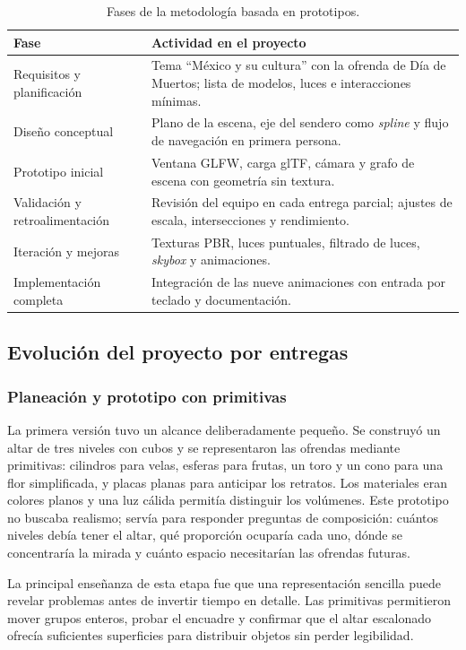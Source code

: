 \documentclass[letter,12pt]{article}
\begin{document}
	\begin{table}[H]
		\centering
		\small
		\begin{tabularx}{\textwidth}{p{4.2cm}X}
			\toprule
			\textbf{Fase} & \textbf{Actividad en el proyecto}\\
			\midrule
			Requisitos y planificación & Tema ``México y su cultura'' con la ofrenda de Día de Muertos; lista de modelos, luces e interacciones mínimas. \\
			Diseño conceptual & Plano de la escena, eje del sendero como \textit{spline} y flujo de navegación en primera persona. \\
			Prototipo inicial & Ventana GLFW, carga glTF, cámara y grafo de escena con geometría sin textura. \\
			Validación y retroalimentación & Revisión del equipo en cada entrega parcial; ajustes de escala, intersecciones y rendimiento. \\
			Iteración y mejoras & Texturas PBR, luces puntuales, filtrado de luces, \textit{skybox} y animaciones. \\
			Implementación completa & Integración de las nueve animaciones con entrada por teclado y documentación. \\
			\bottomrule
		\end{tabularx}
		\caption{Fases de la metodología basada en prototipos.}
		\label{tab:fases}
	\end{table}

	\subsection{Evolución del proyecto por entregas}
	\subsubsection{Planeación y prototipo con primitivas}
	La primera versión tuvo un alcance deliberadamente pequeño. Se construyó un altar de tres niveles con cubos y se representaron las ofrendas mediante primitivas: cilindros para velas, esferas para frutas, un toro y un cono para una flor simplificada, y placas planas para anticipar los retratos. Los materiales eran colores planos y una luz cálida permitía distinguir los volúmenes. Este prototipo no buscaba realismo; servía para responder preguntas de composición: cuántos niveles debía tener el altar, qué proporción ocuparía cada uno, dónde se concentraría la mirada y cuánto espacio necesitarían las ofrendas futuras.

	La principal enseñanza de esta etapa fue que una representación sencilla puede revelar problemas antes de invertir tiempo en detalle. Las primitivas permitieron mover grupos enteros, probar el encuadre y confirmar que el altar escalonado ofrecía suficientes superficies para distribuir objetos sin perder legibilidad.
\end{document}
